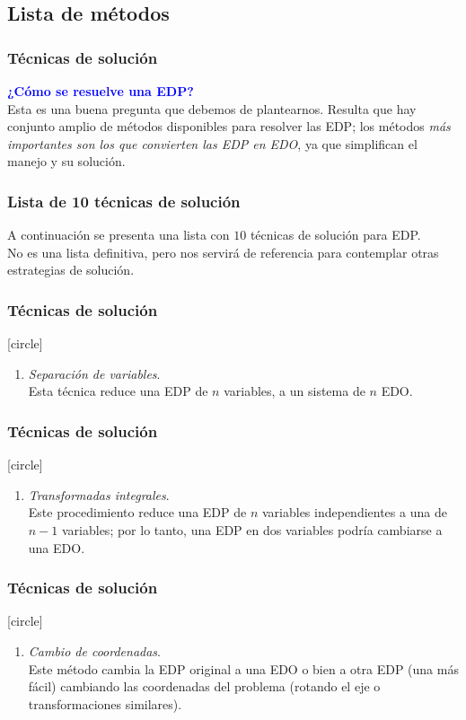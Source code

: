 \subsection{Lista de métodos}
\begin{frame}
\frametitle{Técnicas de solución}
\textcolor{blue}{\textbf{¿Cómo se resuelve una EDP?}}
\\
\bigskip
\pause
Esta es una buena pregunta que debemos de plantearnos. Resulta que hay conjunto amplio de métodos disponibles para resolver las EDP; los métodos \emph{más importantes son los que convierten las EDP en EDO}, ya que simplifican el manejo y su solución.
\end{frame}
\begin{frame}
\frametitle{Lista de 10 técnicas de solución}
A continuación se presenta una lista con $10$ técnicas de solución para EDP.
\\
\bigskip
No es una lista definitiva, pero nos servirá de referencia para contemplar otras estrategias de solución.
\end{frame}
\begin{frame}
\frametitle{Técnicas de solución}
[circle]
\begin{enumerate}
\item \emph{Separación de variables}.
\\
\bigskip
Esta técnica reduce una EDP de $n$ variables, a un sistema de $n$ EDO.
\seti
\end{enumerate}
\end{frame}
\begin{frame}
\frametitle{Técnicas de solución}
[circle]
\begin{enumerate}
\conti
\item \emph{Transformadas integrales}. 
\\
\bigskip
Este procedimiento reduce una EDP de $n$ variables independientes a una de $n - 1$ variables; por lo tanto, una EDP en dos variables podría cambiarse a una EDO.
\seti
\end{enumerate}
\end{frame}
\begin{frame}
\frametitle{Técnicas de solución}
[circle]
\begin{enumerate}
\conti
\item \emph{Cambio de coordenadas}.
\\
\bigskip
Este método cambia la EDP original a una EDO o bien a otra EDP (una más fácil) cambiando las coordenadas del problema (rotando el eje o transformaciones similares).
\seti
\end{enumerate}
\end{frame}
